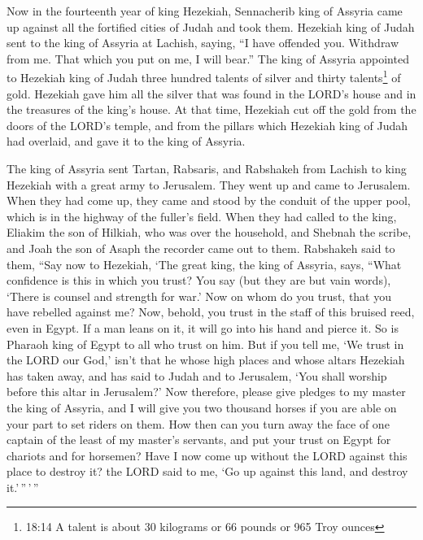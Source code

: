  Now in the fourteenth year of king Hezekiah, Sennacherib
king of Assyria came up against all the fortified cities of Judah and
took them.  Hezekiah king of Judah sent to the king of
Assyria at Lachish, saying, ``I have offended you. Withdraw from me.
That which you put on me, I will bear.'' The king of Assyria appointed
to Hezekiah king of Judah three hundred talents of silver and thirty
talents\footnote{18:14 A talent is about 30 kilograms or 66 pounds or
  965 Troy ounces} of gold.  Hezekiah gave him all the
silver that was found in the LORD's house and in the treasures of the
king's house.  At that time, Hezekiah cut off the gold from
the doors of the LORD's temple, and from the pillars which Hezekiah king
of Judah had overlaid, and gave it to the king of Assyria.

 The king of Assyria sent Tartan, Rabsaris, and Rabshakeh
from Lachish to king Hezekiah with a great army to Jerusalem. They went
up and came to Jerusalem. When they had come up, they came and stood by
the conduit of the upper pool, which is in the highway of the fuller's
field.  When they had called to the king, Eliakim the son
of Hilkiah, who was over the household, and Shebnah the scribe, and Joah
the son of Asaph the recorder came out to them.  Rabshakeh
said to them, ``Say now to Hezekiah, `The great king, the king of
Assyria, says, ``What confidence is this in which you trust?
 You say (but they are but vain words), `There is counsel
and strength for war.' Now on whom do you trust, that you have rebelled
against me?  Now, behold, you trust in the staff of this
bruised reed, even in Egypt. If a man leans on it, it will go into his
hand and pierce it. So is Pharaoh king of Egypt to all who trust on him.
 But if you tell me, `We trust in the LORD our God,' isn't
that he whose high places and whose altars Hezekiah has taken away, and
has said to Judah and to Jerusalem, `You shall worship before this altar
in Jerusalem?'  Now therefore, please give pledges to my
master the king of Assyria, and I will give you two thousand horses if
you are able on your part to set riders on them.  How then
can you turn away the face of one captain of the least of my master's
servants, and put your trust on Egypt for chariots and for horsemen?
 Have I now come up without the LORD against this place to
destroy it? the LORD said to me, `Go up against this land, and destroy
it.'\,''\,'\,''

